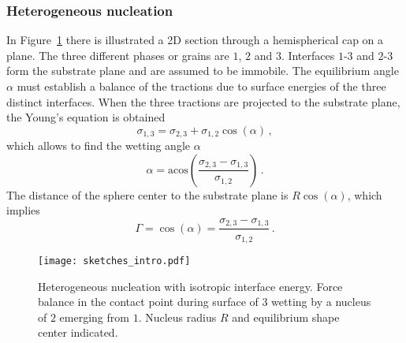         \subsubsection{Heterogeneous nucleation}
        In Figure~\ref{fig_isotropic_wetting} there is illustrated a 2D section through a hemispherical cap on a plane. The three different phases or grains are $\mathit{1}$, $\mathit{2}$ and $\mathit{3}$. Interfaces $\mathit{1}$-$\mathit{3}$ and $\mathit{2}$-$\mathit{3}$ form the substrate plane and are assumed to be immobile. The equilibrium angle $\alpha$ must establish a balance of the tractions due to surface energies of the three distinct interfaces. When the three tractions are projected to the substrate plane, the Young's equation is obtained
        \begin{equation}
            \sigma_{1,3} = \sigma_{2,3} + \sigma_{1,2}\cos(\alpha) \,,
        \end{equation}
        which allows to find the wetting angle $\alpha$ 
        \begin{equation}
            \alpha = \mathrm{acos}\left(\frac{\sigma_{2,3}-\sigma_{1,3}}{\sigma_{1,2}}\right) \,.
        \end{equation}
        The distance of the sphere center to the substrate plane is $R\cos(\alpha)$, which implies
        \begin{equation}
            \Gamma = \cos(\alpha) = \frac{\sigma_{2,3}-\sigma_{1,3}}{\sigma_{1,2}} \,.
        \end{equation}
        
        \begin{figure}
            \centering
            \texttt{[image: sketches\_intro.pdf]}
            \caption{Heterogeneous nucleation with isotropic interface energy. Force balance in the contact point during surface of $\mathit{3}$ wetting by a nucleus of $\mathit{2}$ emerging from $\mathit{1}$. Nucleus radius $R$ and equilibrium shape center indicated.}
            \label{fig_isotropic_wetting}
        \end{figure}
        

